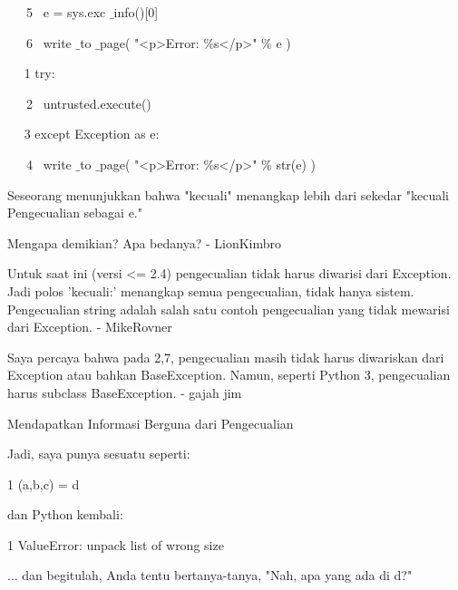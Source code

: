 ~~~5~  e = sys.exc $  \_  $info()[0] \par
\vspace{12pt}
~~~6~  write $  \_  $to $  \_  $page( "<p>Error:  $  \%  $s</p>"  $  \%  $ e ) \par
\vspace{12pt}
~~ 1 try: \par
\vspace{12pt}
~~~2~  untrusted.execute() \par
\vspace{12pt}
~~ 3 except Exception as e: \par
\vspace{12pt}
~~~4~  write $  \_  $to $  \_  $page( "<p>Error:  $  \%  $s</p>"  $  \%  $ str(e) ) \par
\vspace{12pt}
Seseorang menunjukkan bahwa "kecuali" menangkap lebih dari sekedar "kecuali Pengecualian sebagai e." \par
\vspace{12pt}
Mengapa demikian? Apa bedanya? - LionKimbro \par
\vspace{12pt}
Untuk saat ini (versi <= 2.4) pengecualian tidak harus diwarisi dari Exception. Jadi polos 'kecuali:' menangkap semua pengecualian, tidak hanya sistem. Pengecualian string adalah salah satu contoh pengecualian yang tidak mewarisi dari Exception. - MikeRovner \par
\vspace{12pt}
Saya percaya bahwa pada 2,7, pengecualian masih tidak harus diwariskan dari Exception atau bahkan BaseException. Namun, seperti Python 3, pengecualian harus subclass BaseException. - gajah jim \par
\vspace{12pt}
Mendapatkan Informasi Berguna dari Pengecualian \par
\vspace{12pt}
Jadi, saya punya sesuatu seperti: \par
\vspace{12pt}
1 (a,b,c) = d \par
\vspace{12pt}
dan Python kembali: \par
\vspace{12pt}
1 ValueError: unpack list of wrong size \par
\vspace{12pt}
... dan begitulah, Anda tentu bertanya-tanya, "Nah, apa yang ada di d?" \par
